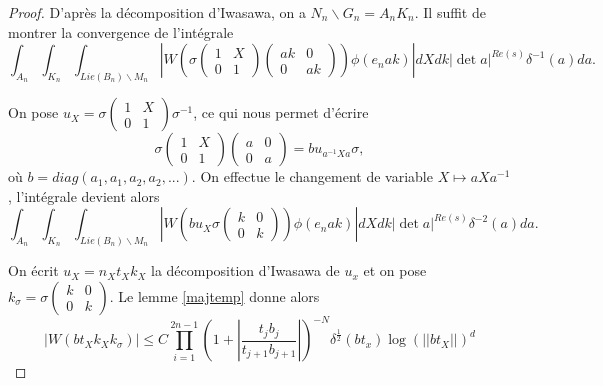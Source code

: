 \documentclass{amsart}
\begin{document}
 \begin{proof}
 D'après la décomposition d'Iwasawa, on a $N_n\backslash{G_n} = A_nK_n$. Il suffit de montrer la convergence de l'intégrale
 \begin{equation}
 \int_{A_n} \int_{K_n} \int_{Lie(B_n)\backslash{M_n}} \left|W\left(\sigma \begin{pmatrix}
1 & X \\
0 & 1
\end{pmatrix}\begin{pmatrix}
ak & 0 \\
0 & ak
\end{pmatrix}\right) \phi(e_nak)\right| dX dk \left|\det a\right|^{Re(s)} \delta^{-1}(a) da.
 \end{equation}
 
 On pose $u_X = \sigma \begin{pmatrix}
1 & X \\
0 & 1
\end{pmatrix} \sigma^{-1}$, ce qui nous permet d'écrire
\begin{equation}
\sigma \begin{pmatrix}
1 & X \\
0 & 1
\end{pmatrix}\begin{pmatrix}
a & 0 \\
0 & a
\end{pmatrix} = b u_{a^{-1}Xa} \sigma,
\end{equation}
 où $b=diag(a_1,a_1,a_2,a_2,...)$. On effectue le changement de variable $X \mapsto aXa^{-1}$, l'intégrale devient alors
 \begin{equation}
\int_{A_n} \int_{K_n} \int_{Lie(B_n)\backslash{M_n}} \left|W\left(b u_X \sigma \begin{pmatrix}
k & 0 \\
0 & k
\end{pmatrix}\right)\phi(e_nak)\right|dX dk |\det a|^{Re(s)} \delta^{-2}(a) da.
 \end{equation}
 
 On écrit $u_X = n_Xt_Xk_X$ la décomposition d'Iwasawa de $u_x$ et on pose $k_\sigma = \sigma \begin{pmatrix}
k & 0 \\
0 & k
\end{pmatrix}$. Le lemme \ref{majtemp} donne alors
 \begin{equation}
 |W(bt_Xk_Xk_\sigma)| \leq C \prod_{i=1}^{2n-1} (1+  |\frac{t_jb_j}{t_{j+1}b_{j+1}}|)^{-N} \delta^{\frac{1}{2}}(bt_x)\log(||bt_X||)^d
 \end{equation}
 

\end{proof}
\end{document}
